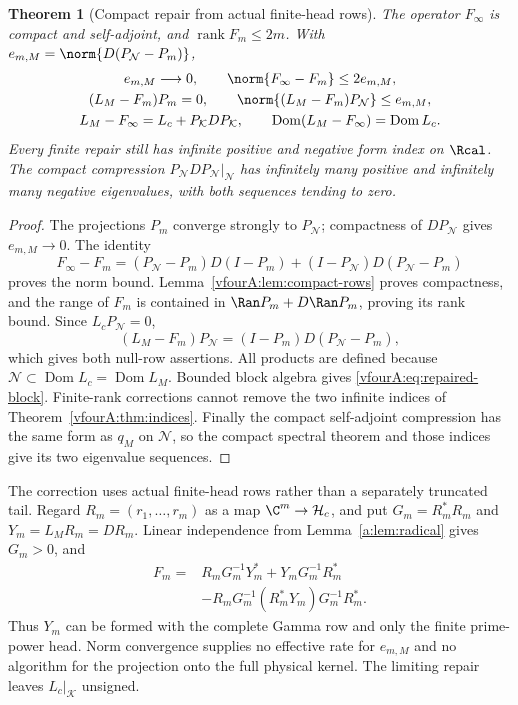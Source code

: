 \documentclass[11pt,a4paper]{article}
\numberwithin{equation}{section}
\newtheorem{theorem}{Theorem}[section]
\theoremstyle{definition}\newtheorem{definition}[theorem]{Definition}
\theoremstyle{remark}\newtheorem{remark}[theorem]{Remark}
\newcommand{\Hh}{\mathcal H}\newcommand{\Hw}{\mathcal H}
\newcommand{\dom}{\operatorname{Dom}}\newcommand{\Var}{\operatorname{Var}}
\newcommand{\rank}{\operatorname{rank}}\newcommand{\ess}{\operatorname{ess}}\newcommand{\supp}{\operatorname{supp}}
\newcommand{\Nn}{\mathcal N}\newcommand{\Ii}{\mathcal I}\newcommand{\Zz}{\mathcal Z}
\newcommand{\Kk}{\mathcal K}\newcommand{\Aa}{\mathcal A}\newcommand{\Ff}{\mathcal F}
\begin{document}
\begin{theorem}[Compact repair from actual finite-head rows]
\label{vfourA:thm:repair}
The operator $F_\infty$ is compact and self-adjoint, and
$\rank F_m\le2m$.  With $e_{m,M}=\norm{D(P_\Nn-P_m)}$,
\begin{gather}
 e_{m,M}\longrightarrow0,\qquad
 \norm{F_\infty-F_m}\le2e_{m,M},\label{vfourA:eq:repair-error}\\
 (L_M-F_m)P_m=0,\qquad
 \norm{(L_M-F_m)P_\Nn}\le e_{m,M},\label{vfourA:eq:null-row}\\
 L_M-F_\infty=L_c+P_\Kk DP_\Kk,
 \qquad\dom(L_M-F_\infty)=\dom L_c.\label{vfourA:eq:repaired-block}
\end{gather}
Every finite repair still has infinite positive and negative form
index on $\Rcal$.  The compact compression
$P_\Nn DP_\Nn|_\Nn$ has infinitely many positive and infinitely many
negative eigenvalues, with both sequences tending to zero.
\end{theorem}
\begin{proof}
The projections $P_m$ converge strongly to $P_\Nn$; compactness of
$DP_\Nn$ gives $e_{m,M}\to0$.  The identity
\[
 F_\infty-F_m=(P_\Nn-P_m)D(I-P_m)
                 +(I-P_\Nn)D(P_\Nn-P_m)
\]
proves the norm bound.  Lemma~\ref{vfourA:lem:compact-rows} proves
compactness, and the range of $F_m$ is contained in
$\Ran P_m+D\Ran P_m$, proving its rank bound.
Since $L_cP_\Nn=0$,
\[
 (L_M-F_m)P_\Nn=(I-P_m)D(P_\Nn-P_m),
\]
which gives both null-row assertions.  All products are defined
because $\Nn\subset\dom L_c=\dom L_M$.  Bounded block algebra gives
\eqref{vfourA:eq:repaired-block}.  Finite-rank corrections cannot remove
the two infinite indices of Theorem~\ref{vfourA:thm:indices}.
Finally the compact self-adjoint compression has the same form as
$q_M$ on $\Nn$, so the compact spectral theorem and those indices
give its two eigenvalue sequences.
\end{proof}

The correction uses actual finite-head rows rather than a separately
truncated tail.  Regard $R_m=(r_1,\ldots,r_m)$ as a map
$\C^m\to\Hh_c$, and put $G_m=R_m^*R_m$ and
$Y_m=L_MR_m=DR_m$.  Linear independence from
Lemma~\ref{a:lem:radical} gives $G_m>0$, and
\begin{equation}\label{vfourA:eq:row-formula}
 \begin{split}
 F_m={}&R_mG_m^{-1}Y_m^*+Y_mG_m^{-1}R_m^*\\
       &-R_mG_m^{-1}(R_m^*Y_m)G_m^{-1}R_m^*.
 \end{split}
\end{equation}
Thus $Y_m$ can be formed with the complete Gamma row and only the
finite prime-power head.  Norm convergence supplies no effective
rate for $e_{m,M}$ and no algorithm for the projection onto the full
physical kernel.  The limiting repair leaves $L_c|_\Kk$ unsigned.
\end{document}
